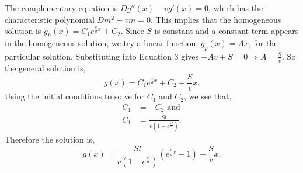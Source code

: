 \documentclass{article}
\begin{document}
The complementary equation is $Dg''(x)-vg'(x)=0$, which has the characteristic polynomial $Dm^2-vm=0$. This implies that the homogeneous solution is $g_h(x)=C_1e^{\frac{v}{d}x}+C_2$. Since $S$ is constant and a constant term appears in the homogeneous solution, we try a linear function, $g_p(x)=Ax$, for the particular solution. Substituting into Equation 3 gives $-Av+S=0\Rightarrow A=\frac{S}{v}$. So the general solution is,
\begin{equation}
    g(x)=C_1e^{\frac{v}{d}x}+C_2+\frac{S}{v}x.
\end{equation}
Using the initial conditions to solve for $C_1$ and $C_2$, we see that,
\begin{equation}
\begin{split}
    C_1&=-C_2 \text{ and}\\
    C_1&=\frac{Sl}{v(1-e^{\frac{vl}{d}})}.
\end{split}
\end{equation}
Therefore the solution is, 
\begin{equation}
    g(x)=\frac{Sl}{v(1-e^{\frac{vl}{d}})}\left(e^{\frac{v}{d}x}-1\right)+\frac{S}{v}x.
\end{equation}
\end{document}
